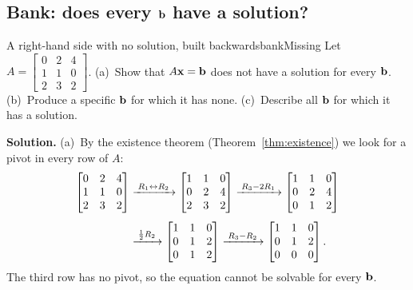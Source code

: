 \documentclass[11pt]{article}
\begin{document}
\subsection*{Bank: does every $\mathbf{b}$ have a solution?}

\begin{exmp}{A right-hand side with no solution, built backwards}{bankMissing}
Let $A=\begin{bmatrix}0&2&4\\1&1&0\\2&3&2\end{bmatrix}$. (a)~Show that $A\mathbf{x}=\mathbf{b}$ does not have a solution for every $\mathbf{b}$. (b)~Produce a specific $\mathbf{b}$ for which it has none. (c)~Describe all $\mathbf{b}$ for which it has a solution.

\textbf{Solution.} (a)~By the existence theorem (Theorem~\ref{thm:existence}) we look for a pivot in every row of $A$:
\begin{align*}
\begin{bmatrix}0&2&4\\1&1&0\\2&3&2\end{bmatrix}
&\xrightarrow{\;R_1\leftrightarrow R_2\;}
\begin{bmatrix}1&1&0\\0&2&4\\2&3&2\end{bmatrix}
\xrightarrow{\;R_3-2R_1\;}
\begin{bmatrix}1&1&0\\0&2&4\\0&1&2\end{bmatrix}\\[4pt]
&\xrightarrow{\;\frac12R_2\;}
\begin{bmatrix}1&1&0\\0&1&2\\0&1&2\end{bmatrix}
\xrightarrow{\;R_3-R_2\;}
\begin{bmatrix}1&1&0\\0&1&2\\0&0&0\end{bmatrix}.
\end{align*}
The third row has no pivot, so the equation cannot be solvable for every $\mathbf{b}$.


\end{exmp}
\end{document}
